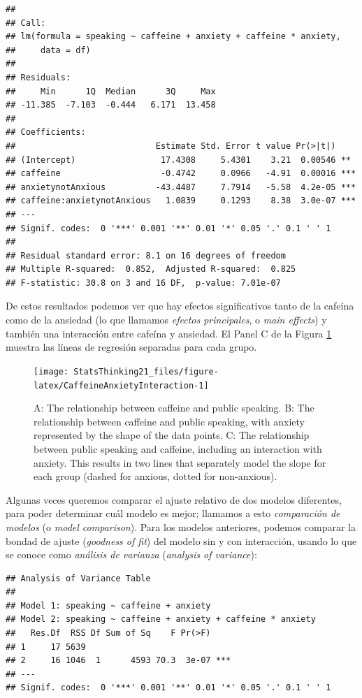 \documentclass[
  12pt,
]{book}
\theoremstyle{definition}
\theoremstyle{definition}
\theoremstyle{definition}
\theoremstyle{remark}
\begin{document}
\begin{verbatim}
## 
## Call:
## lm(formula = speaking ~ caffeine + anxiety + caffeine * anxiety, 
##     data = df)
## 
## Residuals:
##     Min      1Q  Median      3Q     Max 
## -11.385  -7.103  -0.444   6.171  13.458 
## 
## Coefficients:
##                            Estimate Std. Error t value Pr(>|t|)    
## (Intercept)                 17.4308     5.4301    3.21  0.00546 ** 
## caffeine                    -0.4742     0.0966   -4.91  0.00016 ***
## anxietynotAnxious          -43.4487     7.7914   -5.58  4.2e-05 ***
## caffeine:anxietynotAnxious   1.0839     0.1293    8.38  3.0e-07 ***
## ---
## Signif. codes:  0 '***' 0.001 '**' 0.01 '*' 0.05 '.' 0.1 ' ' 1
## 
## Residual standard error: 8.1 on 16 degrees of freedom
## Multiple R-squared:  0.852,	Adjusted R-squared:  0.825 
## F-statistic: 30.8 on 3 and 16 DF,  p-value: 7.01e-07
\end{verbatim}

De estos resultados podemos ver que hay efectos significativos tanto de la cafeína como de la ansiedad (lo que llamamos \emph{efectos principales}, o \emph{main effects}) y también una interacción entre cafeína y ansiedad. El Panel C de la Figura \ref{fig:CaffeineAnxietyInteraction} muestra las líneas de regresión separadas para cada grupo.

\begin{figure}
\texttt{[image: StatsThinking21\_files/figure-latex/CaffeineAnxietyInteraction-1]} \caption{A: The relationship between caffeine and public speaking. B: The relationship between caffeine and public speaking, with anxiety represented by the shape of the data points. C: The relationship between public speaking and caffeine, including an interaction with anxiety.  This results in two lines that separately model the slope for each group (dashed for anxious, dotted for non-anxious).}\label{fig:CaffeineAnxietyInteraction}
\end{figure}

Algunas veces queremos comparar el ajuste relativo de dos modelos diferentes, para poder determinar cuál modelo es mejor; llamamos a esto \emph{comparación de modelos} (o \emph{model comparison}). Para los modelos anteriores, podemos comparar la bondad de ajuste (\emph{goodness of fit}) del modelo sin y con interacción, usando lo que se conoce como \emph{análisis de varianza} (\emph{analysis of variance}):

\begin{verbatim}
## Analysis of Variance Table
## 
## Model 1: speaking ~ caffeine + anxiety
## Model 2: speaking ~ caffeine + anxiety + caffeine * anxiety
##   Res.Df  RSS Df Sum of Sq    F Pr(>F)    
## 1     17 5639                             
## 2     16 1046  1      4593 70.3  3e-07 ***
## ---
## Signif. codes:  0 '***' 0.001 '**' 0.01 '*' 0.05 '.' 0.1 ' ' 1
\end{verbatim}
\end{document}

